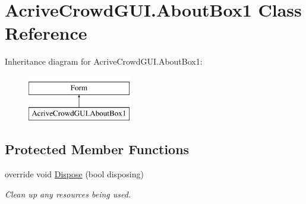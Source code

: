 \hypertarget{class_acrive_crowd_g_u_i_1_1_about_box1}{}\section{Acrive\+Crowd\+G\+U\+I.\+About\+Box1 Class Reference}
\label{class_acrive_crowd_g_u_i_1_1_about_box1}
Inheritance diagram for Acrive\+Crowd\+G\+U\+I.\+About\+Box1\+:\begin{figure}[H]
\begin{center}
\leavevmode
\includegraphics[height=2.000000cm]{class_acrive_crowd_g_u_i_1_1_about_box1}
\end{center}
\end{figure}
\subsection*{Protected Member Functions}
\begin{DoxyCompactItemize}
\item 
override void \hyperlink{class_acrive_crowd_g_u_i_1_1_about_box1_aa3e061496143d43b127d1eba731fb202}{Dispose} (bool disposing)
\begin{DoxyCompactList}\small\item\em Clean up any resources being used. \end{DoxyCompactList}\end{DoxyCompactItemize}
